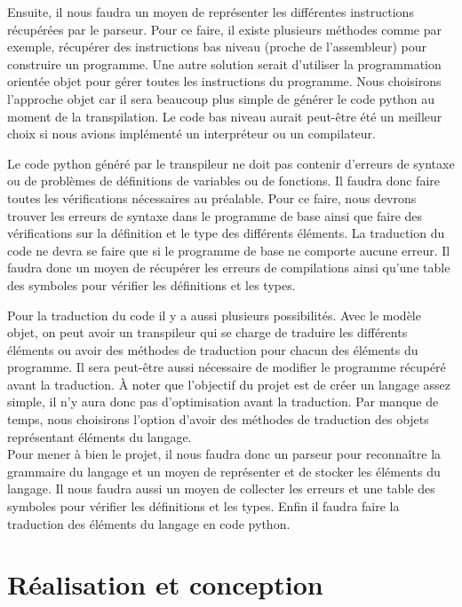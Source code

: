 \documentclass[a4paper]{article}%
\begin{document}
Ensuite, il nous faudra un moyen de représenter les différentes instructions
récupérées par le parseur. Pour ce faire, il existe plusieurs méthodes
comme par exemple, récupérer des instructions bas niveau (proche de
l'assembleur) pour construire un programme. Une autre solution serait d'utiliser
la programmation orientée objet pour gérer toutes les instructions du programme.
Nous choisirons l'approche objet car il sera beaucoup plus simple de générer le
code python au moment de la transpilation. Le code bas niveau aurait peut-être
été un meilleur choix si nous avions implémenté un interpréteur ou un
compilateur.

Le code python généré par le transpileur ne doit pas contenir d'erreurs de
syntaxe ou de problèmes de définitions de variables ou de fonctions. Il faudra
donc faire toutes les vérifications nécessaires au préalable. Pour ce faire,
nous devrons trouver les erreurs de syntaxe dans le programme de base ainsi que
faire des vérifications sur la définition et le type des différents éléments. La
traduction du code ne devra se faire que si le programme de base ne comporte
aucune erreur. Il faudra donc un moyen de récupérer les erreurs de compilations
ainsi qu'une table des symboles pour vérifier les définitions et les types.

Pour la traduction du code il y a aussi plusieurs possibilités. Avec le modèle
objet, on peut avoir un transpileur qui se charge de traduire les différents
éléments ou avoir des méthodes de traduction pour chacun des éléments du
programme. Il sera peut-être aussi nécessaire de modifier le programme récupéré
avant la traduction. À noter que l'objectif du projet est de créer un langage
assez simple, il n'y aura donc pas d'optimisation avant la traduction. Par
manque de temps, nous choisirons l'option d'avoir des méthodes de traduction des
objets représentant éléments du langage.\\

Pour mener à bien le projet, il nous faudra donc un parseur pour reconnaître la
grammaire du langage et un moyen de représenter et de stocker les éléments du
langage. Il nous faudra aussi un moyen de collecter les erreurs et une table des
symboles pour vérifier les définitions et les types. Enfin il faudra faire la
traduction des éléments du langage en code python.

\clearpage
\part{Réalisation et conception}
\end{document}
